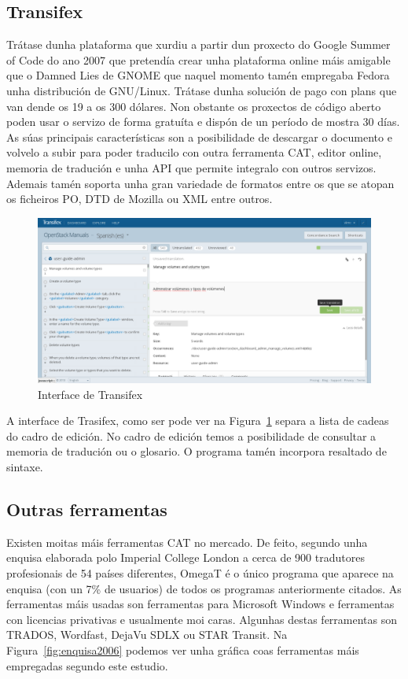 \subsection{Transifex}
Trátase dunha plataforma que xurdiu a partir dun proxecto do Google Summer of Code do ano 2007 que pretendía crear unha plataforma online máis amigable que o Damned Lies de GNOME que naquel momento tamén empregaba Fedora unha distribución de GNU/Linux. Trátase dunha solución de pago con plans que van dende os 19 a os 300 dólares. Non obstante os proxectos de código aberto poden usar o servizo de forma gratuíta e dispón de un período de mostra 30 días. As súas principais características son a posibilidade de descargar o documento e volvelo a subir para poder traducilo con outra ferramenta CAT, editor online, memoria de tradución e unha API que permite integralo con outros servizos. Ademais tamén soporta unha gran variedade de formatos entre os que se atopan os ficheiros PO, DTD de Mozilla ou XML entre outros.

\begin{figure}[h]
    \centering
    \includegraphics[width=\textwidth]{img/captura_transifex.png}
    \caption{Interface de Transifex}
    \label{fig:transifex}
\end{figure}

A interface de Trasifex, como ser pode ver na Figura~\ref{fig:transifex} separa a lista de cadeas do cadro de edición. No cadro de edición temos a posibilidade de consultar a memoria de tradución ou o glosario. O programa tamén incorpora resaltado de sintaxe.

\subsection{Outras ferramentas}
Existen moitas máis ferramentas CAT no mercado. De feito, segundo unha enquisa \cite{article:2006survey} elaborada polo Imperial College London a cerca de 900 tradutores profesionais de 54 países diferentes, OmegaT é o único programa que aparece na enquisa (con un 7\% de usuarios) de todos os programas anteriormente citados. As ferramentas máis usadas son ferramentas para Microsoft Windows e ferramentas con licencias privativas e usualmente moi caras. Algunhas destas ferramentas son TRADOS, Wordfast, DejaVu SDLX ou STAR Transit. Na Figura~\ref{fig:enquisa2006} podemos ver unha gráfica coas ferramentas máis empregadas segundo este estudio.

